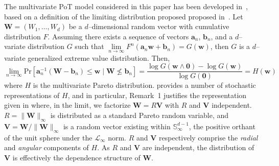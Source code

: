 The multivariate PoT model considered in this paper has been developed 
    in~\cite{trubey:pg}, based on a definition of the limiting distribution proposed
    proposed in~\cite{rootzen2018}.  
    Let $\bm{W} = (W_1,\ldots,W_d)$ be a $d$--dimensional random vector with 
    cumulative distribution $F$.  Assuming there exists a sequence of vectors
    $\bm{a}_n$, $\bm{b}_n$, and a $d$--variate distribution $G$ such that 
    $\lim\limits_{n\to\infty}F^n(\bm{a}_n\bm{w} + \bm{b}_n) = G(\bm{w})$, then
    $G$ is a $d$--variate generalized extreme value distribution.  Then,
    \begin{equation}
        \label{eqn:threshold}
        \lim\limits_{n\to\infty}\text{Pr}
            \left[\bm{a}_n^{-1}(\bm{W} - \bm{b}_n) 
                \leq \bm{w}\mid \bm{W}\not\leq \bm{b}_n\right]
        = \frac{\log G(\bm{w}\wedge \bm{0}) - \log G(\bm{w})}{\log G(\bm{0})}
        = H(\bm{w})
    \end{equation}
    where $H$ is the multivariate Pareto distribution.  \cite{rootzen2018}
    provides a number of stochastic representations of $H$, and in particular,
    Remark~1 justifies the representation given in \cite{ferreira2014} where,
    in the limit, we factorize $\bm{W} = R\bm{V}$ with $R$ and $\bm{V}$ independent.
    $R = \lVert \bm{W}\rVert_{\infty}$ is distributed as a standard Pareto random
    variable, and $\bm{V} = \bm{W} / \lVert \bm{W}\rVert_{\infty}$ is a random
    vector existing within $\mathbb{S}_{\infty}^{d-1}$, the positive orthant of
    the unit sphere under the $\mathcal{L}_{\infty}$ norm.  $R$ and $\bm{V}$
    respectively comprise the \emph{radial} and \emph{angular} components of $H$.
    As $R$ and $\bm{V}$ are independent,  the distribution of $\bm{V}$ is 
    effectively the dependence structure of $\bm{W}$.


